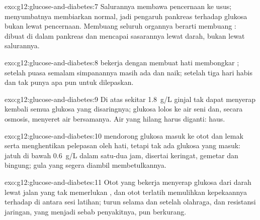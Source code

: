 \begin{solution}{exo:g12:glucose-and-diabetes:7}
Salurannya membawa  pencernaan ke usus; menyumbatnya membiarkan
 normal, jadi pengaruh pankreas terhadap glukosa bukan lewat
pencernaan. Membuang seluruh organnya berarti membuang :  dibuat di dalam pankreas dan mencapai sasarannya
lewat darah, bukan lewat salurannya.
\end{solution}

\begin{solution}{exo:g12:glucose-and-diabetes:8}
 bekerja dengan membuat hati membongkar ; setelah
puasa semalam simpanannya masih ada dan  naik; setelah tiga
hari  habis dan  tak punya apa pun untuk dilepaskan.
\end{solution}

\begin{solution}{exo:g12:glucose-and-diabetes:9}
Di atas sekitar \qty{1.8}{g/L} ginjal tak dapat menyerap kembali semua
glukosa yang disaringnya; glukosa lolos ke air seni dan, secara
osmosis, menyeret air bersamanya. Air yang hilang harus diganti: haus.
\end{solution}

\begin{solution}{exo:g12:glucose-and-diabetes:10}
 mendorong glukosa masuk ke otot dan  lemak serta
menghentikan pelepasan oleh hati, tetapi tak ada glukosa yang masuk:
 jatuh di bawah \qty{0.6}{g/L} dalam satu-dua jam, disertai
keringat, gemetar dan bingung; gula yang segera diambil membetulkannya.
\end{solution}

\begin{solution}{exo:g12:glucose-and-diabetes:11}
Otot yang bekerja menyerap glukosa dari darah lewat jalan yang tak
memerlukan , dan otot terlatih memulihkan kepekaannya terhadap
 di antara sesi latihan;  turun selama dan setelah
olahraga, dan resistansi jaringan, yang menjadi sebab penyakitnya, pun
berkurang.
\end{solution}

